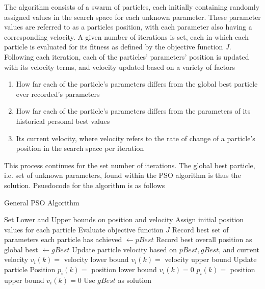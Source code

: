 The algorithm consists of a swarm of particles, each initially containing randomly assigned values in the search space for each unknown
parameter. These parameter values are referred to as a particles position, with each parameter also having a corresponding velocity. A given number of iterations is set, each in which
each particle is evaluated for its fitness as defined by the objective function $J$. Following each iteration, each of the particles' parameters' position is updated with its velocity terms,
and velocity updated based on a variety of factors
\begin{enumerate}
    \item How far each of the particle's parameters differs from the global best particle ever recorded's parameters
    \item How far each of the particle's parameters differs from the parameters of its historical personal best values
    \item Its current velocity, where velocity refers to the rate of change of a particle's position in the search space per iteration
\end{enumerate}

\noindent This process continues for the set number of iterations. The global best particle, i.e. set of unknown parameters, found 
within the PSO algorithm is thus the solution. Psuedocode for the algorithm is as follows

\begin{algorithm}[H]
    \caption{General PSO Algorithm}
    \begin{algorithmic}
    
    \STATE Set Lower and Upper bounds on position and velocity
    \STATE Assign initial position values for each particle
    \ENDFOR
    \STATE Evaluate objective function $J$
    \ENDFOR
    \STATE Record best set of parameters each particle has achieved $\leftarrow pBest$
    \STATE Record best overall position as global best $\leftarrow gBest$
    \STATE Update particle velocity based on $pBest, gBest$, and current velocity
    \STATE $v_i(k) = $ velocity lower bound
    \STATE $v_i(k) = $ velocity upper bound
    \ENDIF
    \STATE Update particle Position
    \STATE $p_i(k) = $ position lower bound
    \STATE $v_i(k) = 0$
    \STATE $p_i(k) = $ position upper bound
    \STATE $v_i(k) = 0$
    \ENDIF
    \ENDFOR
    \ENDFOR
    \STATE Use $gBest$ as solution
    \end{algorithmic}

\end{algorithm}

